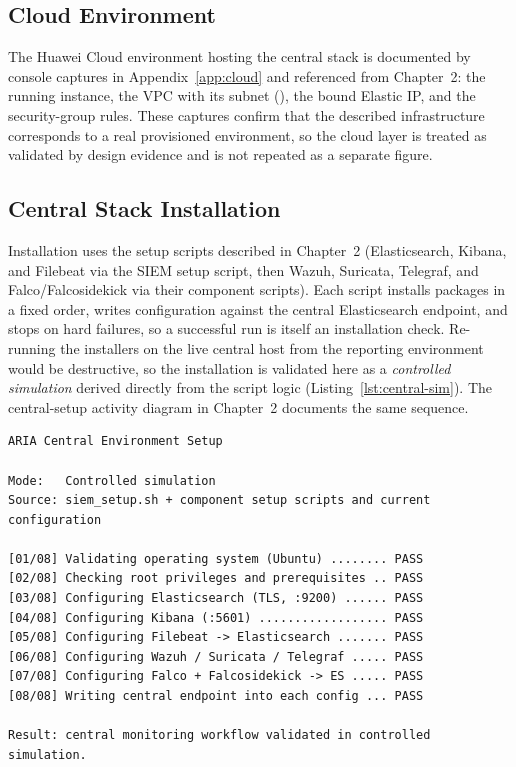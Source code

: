 \subsection{Cloud Environment}

The Huawei Cloud environment hosting the central stack is documented by console captures in Appendix~\ref{app:cloud} and referenced from Chapter~2: the running  instance, the  VPC with its  subnet (), the bound Elastic IP, and the security-group rules. These captures confirm that the described infrastructure corresponds to a real provisioned environment, so the cloud layer is treated as validated by design evidence and is not repeated as a separate figure.

\subsection{Central Stack Installation}

Installation uses the setup scripts described in Chapter~2 (Elasticsearch, Kibana, and Filebeat via the SIEM setup script, then Wazuh, Suricata, Telegraf, and Falco/Falcosidekick via their component scripts). Each script installs packages in a fixed order, writes configuration against the central Elasticsearch endpoint, and stops on hard failures, so a successful run is itself an installation check. Re-running the installers on the live central host from the reporting environment would be destructive, so the installation is validated here as a \emph{controlled simulation} derived directly from the script logic (Listing~\ref{lst:central-sim}). The central-setup activity diagram in Chapter~2 documents the same sequence.

\begin{lstlisting}[style=ariaterm,caption={Controlled Simulation Result: central environment setup validation},label={lst:central-sim},
  emph={[2]PASS}, emphstyle={[2]\color{green!60!black}\bfseries}]
ARIA Central Environment Setup

Mode:   Controlled simulation
Source: siem_setup.sh + component setup scripts and current configuration

[01/08] Validating operating system (Ubuntu) ........ PASS
[02/08] Checking root privileges and prerequisites .. PASS
[03/08] Configuring Elasticsearch (TLS, :9200) ...... PASS
[04/08] Configuring Kibana (:5601) .................. PASS
[05/08] Configuring Filebeat -> Elasticsearch ....... PASS
[06/08] Configuring Wazuh / Suricata / Telegraf ..... PASS
[07/08] Configuring Falco + Falcosidekick -> ES ..... PASS
[08/08] Writing central endpoint into each config ... PASS

Result: central monitoring workflow validated in controlled simulation.
\end{lstlisting}

